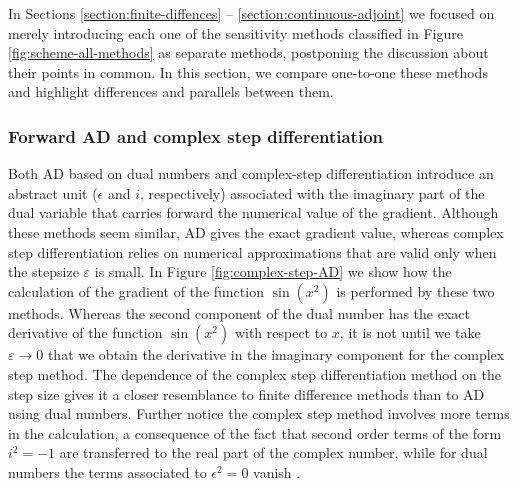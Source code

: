 In Sections \ref{section:finite-diffences} -- \ref{section:continuous-adjoint} we focused on merely introducing each one of the sensitivity methods classified in Figure \ref{fig:scheme-all-methods} as separate methods, postponing the discussion about their points in common. 
In this section, we compare one-to-one these methods and highlight differences and parallels between them. 


\subsubsection{Forward AD and complex step differentiation}

Both AD based on dual numbers and complex-step differentiation introduce an abstract unit ($\epsilon$ and $i$, respectively) associated with the imaginary part of the dual variable that carries forward the numerical value of the gradient.
Although these methods seem similar, AD gives the exact gradient value, whereas complex step differentiation relies on numerical approximations that are valid only when the stepsize $\varepsilon$ is small. 
In Figure \ref{fig:complex-step-AD} we show how the calculation of the gradient of the function $\sin (x^2)$ is performed by these two methods.
Whereas the second component of the dual number has the exact derivative of the function $\sin(x^2)$ with respect to $x$, it is not until we take $\varepsilon \rightarrow 0$ that we obtain the derivative in the imaginary component for the complex step method.
The dependence of the complex step differentiation method on the step size gives it a closer resemblance to finite difference methods than to AD using dual numbers.
Further notice the complex step method involves more terms in the calculation, a consequence of the fact that second order terms of the form $i^2 = -1$ are transferred to the real part of the complex number, while for dual numbers the terms associated to $\epsilon^2 = 0$ vanish \cite{martins2001connection}. 

